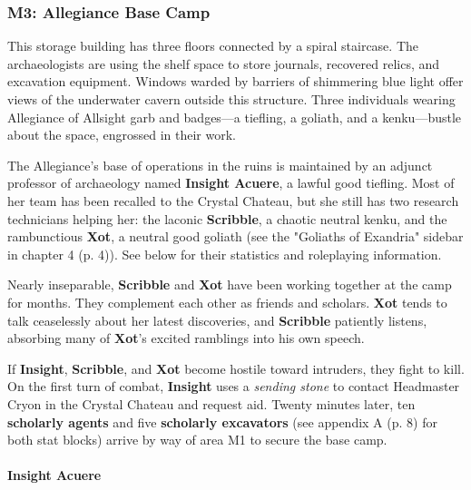 \documentclass[a4paper, 11pt, bg=full, twocolumn, nooutline]{dndbook}
\begin{document}

\subsubsection{M3: Allegiance Base Camp}

\begin{DndReadAloud}
This storage building has three floors connected by a spiral staircase. The archaeologists are using the shelf space to store journals, recovered relics, and excavation equipment. Windows warded by barriers of shimmering blue light offer views of the underwater cavern outside this structure.
Three individuals wearing Allegiance of Allsight garb and badges---a tiefling, a goliath, and a kenku---bustle about the space, engrossed in their work.
\end{DndReadAloud}

The Allegiance's base of operations in the ruins is maintained by an adjunct professor of archaeology named \textbf{Insight Acuere}, a lawful good tiefling. Most of her team has been recalled to the Crystal Chateau, but she still has two research technicians helping her: the laconic \textbf{Scribble}, a chaotic neutral kenku, and the rambunctious \textbf{Xot}, a neutral good goliath (see the "Goliaths of Exandria" sidebar in chapter 4 (p. 4)). See below for their statistics and roleplaying information.

Nearly inseparable, \textbf{Scribble} and \textbf{Xot} have been working together at the camp for months. They complement each other as friends and scholars. \textbf{Xot} tends to talk ceaselessly about her latest discoveries, and \textbf{Scribble} patiently listens, absorbing many of \textbf{Xot}'s excited ramblings into his own speech.

If \textbf{Insight}, \textbf{Scribble}, and \textbf{Xot} become hostile toward intruders, they fight to kill. On the first turn of combat, \textbf{Insight} uses a \textit{sending stone} to contact Headmaster Cryon in the Crystal Chateau and request aid. Twenty minutes later, ten \textbf{scholarly agents} and five \textbf{scholarly excavators} (see appendix A (p. 8) for both stat blocks) arrive by way of area M1 to secure the base camp.


\paragraph{Insight Acuere}
\end{document}
